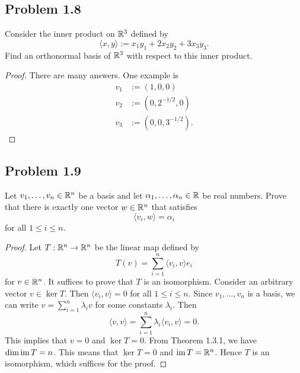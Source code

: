 \documentclass[12pt]{article}
\begin{document}
\newpage 

\subsection{Problem 1.8}

\begin{problem}
	Consider the inner product on $\mathbb{R}^3$ defined by
	\[
		\langle x, y \rangle := x_1 y_1 + 2 x_2y_2 + 3x_3y_3.
	\]
	Find an orthonormal basis of $\mathbb{R}^3$ with respect to this inner product. 
\end{problem}
\begin{proof}
	There are many answers. One example is 
	\begin{align*}
		v_1 & := (1, 0, 0) \\
		v_2 & := (0, 2^{-1/2}, 0) \\
		v_3 & := (0, 0, 3^{-1/2}).
	\end{align*}
\end{proof}

\newpage 

\subsection{Problem 1.9}

\begin{problem} \label{problem-1.9}
	Let $v_1, \ldots, v_n \in \mathbb{R}^n$ be a basis and let $\alpha_1, \ldots, \alpha_n \in \mathbb{R}$ be real numbers. Prove that there is exactly one vector $w \in \mathbb{R}^n$ that satisfies
	\[
		\langle v_i, w \rangle = \alpha_i
	\]
	for all $1 \leq i \leq n$. 
\end{problem}

\begin{proof}
	Let $T : \mathbb{R}^n \to \mathbb{R}^n$ be the linear map defined by 
	\[
		T(v) = \sum_{i = 1}^n \langle v_i, v \rangle e_i
	\]
	for $v \in \mathbb{R}^n$. It suffices to prove that $T$ is an isomorphism. Consider an arbitrary vector $v \in \ker T$. Then $\langle v_i, v \rangle = 0$ for all $1 \leq i \leq n$. Since $v_1, \ldots, v_n$ is a basis, we can write $v = \sum_{i = 1}^n \lambda_i v$ for some constants $\lambda_i$. Then 
	\[
		\langle v,  v \rangle = \sum_{i = 1}^n \lambda_i \langle v_i, v \rangle = 0.
	\]
	This implies that $v = 0$ and $\ker T = 0$. From Theorem 1.3.1, we have $\dim \operatorname{im} T = n$. This means that $\ker T = 0$ and $\operatorname{im} T = \mathbb{R}^n$. Hence $T$ is an isomorphism, which suffices for the proof. 
\end{proof}

\newpage 
\end{document}
